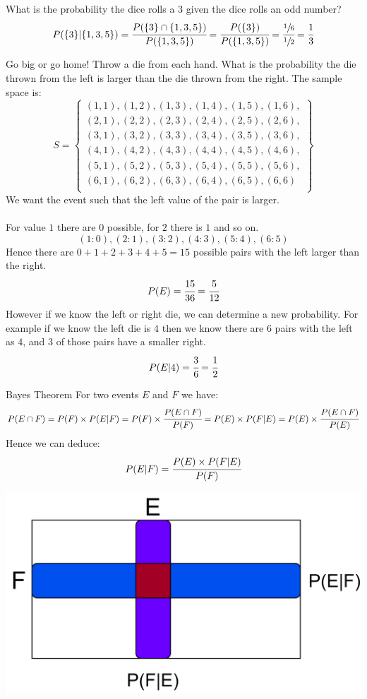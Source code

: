\begin{examplebox}
    What is the probability the dice rolls a $3$ given the dice rolls an odd number?
    \tcblower
    \[P(\{3\}|\{1,3,5\}) = \cfrac{P(\{3\} \cap \{1,3,5\})}{P(\{1,3,5\})} = \cfrac{P(\{3\})}{P(\{1,3,5\})} = \cfrac{\sfrac{1}{6}}{\sfrac{1}{2}} = \cfrac{1}{3}\]
\end{examplebox}
    
\begin{examplebox}{Go big or go home!}
Throw a die from each hand. What is the probability the die thrown from the left is larger than the die thrown from the right.
\tcblower
The sample space is:
\[S = \begin{Bmatrix}
		(1,1),(1,2),(1,3),(1,4),(1,5),(1,6), \\
        (2,1),(2,2),(2,3),(2,4),(2,5),(2,6), \\
        (3,1),(3,2),(3,3),(3,4),(3,5),(3,6), \\
		(4,1),(4,2),(4,3),(4,4),(4,5),(4,6), \\
        (5,1),(5,2),(5,3),(5,4),(5,5),(5,6), \\
        (6,1),(6,2),(6,3),(6,4),(6,5),(6,6)  \\
	\end{Bmatrix}\]
We want the event such that the left value of the pair is larger.
\\
\\ For value $1$ there are $0$ possible, for $2$ there is $1$ and so on.
\[(1:0),(2:1),(3:2),(4:3),(5:4),(6:5)\]
Hence there are $0 + 1 + 2 + 3 + 4 + 5 = 15$ possible pairs with the left larger than the right.
\[P(E) = \cfrac{15}{36} = \cfrac{5}{12}\]
However if we know the left or right die, we can determine a new probability. For example if we know the left die is $4$ then we know there are $6$ pairs with the left as $4$, and $3$ of those pairs have a smaller right.
\[P(E|{4}) = \cfrac{3}{6} = \cfrac{1}{2}\]
\end{examplebox}    
\begin{definitionbox}{Bayes Theorem}
	For two events $E$ and $F$ we have:
	\[P(E \cap F) = P(F) \times P(E|F) = P(F) \times \cfrac{P(E \cap F)}{P(F)} = P(E) \times P(F|E) = P(E) \times \cfrac{P(E \cap F)}{P(E)}\]
	Hence we can deduce:
	\[P(E|F) = \cfrac{P(E) \times P(F|E)}{P(F)}\]
    \begin{center}
        \includegraphics[width=.6\textwidth]{elementary_probability_theory/images/bayes theorem.drawio.png}
    \end{center}
\end{definitionbox}

